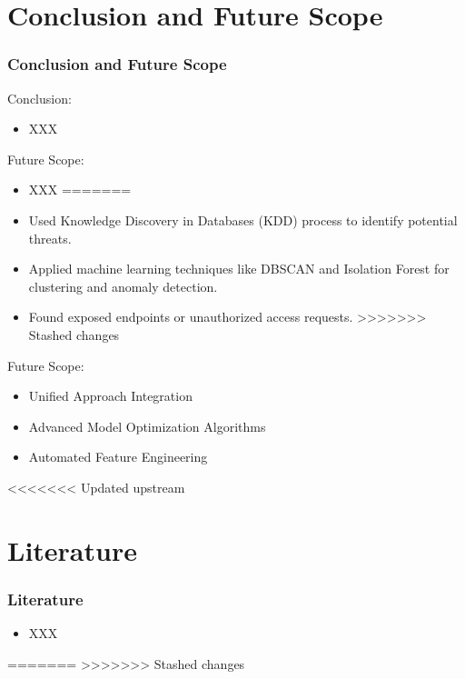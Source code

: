 \documentclass[10pt, a4paper]{beamer}
\begin{document}
	
	\section{Conclusion and Future Scope}
	\begin{frame}
		\frametitle{Conclusion and Future Scope}
		
		\begin{block}{Conclusion:}
			\begin{itemize}
<<<<<<< Updated upstream
				\item XXX
			\end{itemize}
		\end{block}
		
		\begin{block}{Future Scope:}
			\begin{itemize}
				\item XXX
=======
				\item Used Knowledge Discovery in Databases (KDD) process to identify potential threats.
				\item Applied machine learning techniques like DBSCAN and Isolation Forest for clustering and anomaly detection.
				\item Found exposed endpoints or unauthorized access requests.
>>>>>>> Stashed changes
			\end{itemize}
		\end{block}
		
				\begin{block}{Future Scope:}
			\begin{itemize}
				\item Unified Approach Integration
				\item Advanced Model Optimization Algorithms
				\item Automated Feature Engineering				
			\end{itemize}
		\end{block}
	
	\end{frame}
	
	
<<<<<<< Updated upstream
	\section{Literature}
	\begin{frame}
		\frametitle{Literature}
		
		
		\begin{itemize}
			\item XXX
		\end{itemize}
		
	\end{frame}
=======
>>>>>>> Stashed changes
	
	
	
	
	
\end{document}
